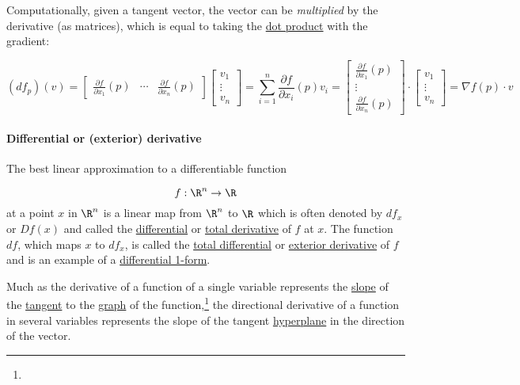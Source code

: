 \documentclass[
]{article}
\begin{document}
Computationally, given a tangent vector, the vector can be
\emph{multiplied} by the derivative (as matrices), which is equal to
taking the \href{dot_product}{dot product} with the gradient:

\[(df_p)(v) = \begin{bmatrix}\frac{\partial f}{\partial x_1}(p) & \cdots & \frac{\partial f}{\partial x_n}(p) \end{bmatrix}
\begin{bmatrix}v_1 \\ \vdots \\ v_n\end{bmatrix}
= \sum_{i=1}^n \frac{\partial f}{\partial x_i}(p) v_i
= \begin{bmatrix}\frac{\partial f}{\partial x_1}(p) \\ \vdots \\ \frac{\partial f}{\partial x_n}(p) \end{bmatrix} \cdot \begin{bmatrix}v_1 \\ \vdots \\ v_n\end{bmatrix}
= \nabla f(p) \cdot v\]

\hypertarget{differential_or_exterior_derivative}{%
\paragraph{Differential or (exterior)
derivative}\label{differential_or_exterior_derivative}}

The best linear approximation to a differentiable function

\[f : \R^n \to \R\] at a point \(x\) in \(\R^n\) is a linear map from
\(\R^n\) to \(\R\) which is often denoted by \(df_x\) or \(Df(x)\) and
called the \href{differential_(calculus)}{differential} or
\href{total_derivative}{total derivative} of \(f\) at \(x\). The
function \(df\), which maps \(x\) to \(df_x\), is called the
\href{total_differential}{total differential} or
\href{exterior_derivative}{exterior derivative} of \(f\) and is an
example of a \href{differential_1-form}{differential 1-form}.

Much as the derivative of a function of a single variable represents the
\url{slope} of the \url{tangent} to the
\href{graph_of_a_function}{graph} of the function,\footnote{} the
directional derivative of a function in several variables represents the
slope of the tangent \url{hyperplane} in the direction of the vector.
\end{document}
